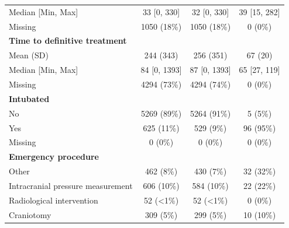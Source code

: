 \documentclass[12pt, a4paper]{article}
\begin{document}
\begin{appendices}
\begin{table}[t!]
{\begin{tabular}{lccc}
				\hspace{3mm}Median [Min, Max]                 & 33 [0, 330]       & 32 [0, 330]       & 39 [15, 282]  \\
				\hspace{3mm}Missing                           & 1050 (18\%)       & 1050 (18\%)       & 0 (0\%)       \\
				\textbf{Time to definitive treatment}         &                   &                   &               \\
				\hspace{3mm}Mean (SD)                         & 244 (343)         & 256 (351)         & 67 (20)       \\
				\hspace{3mm}Median [Min, Max]                 & 84 [0, 1393]      & 87 [0, 1393]      & 65 [27, 119]  \\
				\hspace{3mm}Missing                           & 4294 (73\%)       & 4294 (74\%)       & 0 (0\%)       \\
				\textbf{Intubated}                            &                   &                   &               \\
				\hspace{3mm}No                                & 5269 (89\%)       & 5264 (91\%)       & 5 (5\%)       \\
				\hspace{3mm}Yes                               & 625 (11\%)        & 529 (9\%)         & 96 (95\%)     \\
				\hspace{3mm}Missing                           & 0 (0\%)           & 0 (0\%)           & 0 (0\%)       \\
				\textbf{Emergency procedure}                  &                   &                   &               \\
				\hspace{3mm}Other                             & 462 (8\%)         & 430 (7\%)         & 32 (32\%)     \\
				\hspace{3mm}Intracranial pressure measurement & 606 (10\%)        & 584 (10\%)        & 22 (22\%)     \\
				\hspace{3mm}Radiological intervention         & 52 (\textless1\%) & 52 (\textless1\%) & 0 (0\%)       \\
				\hspace{3mm}Craniotomy                        & 309 (5\%)         & 299 (5\%)         & 10 (10\%)     \\

\end{tabular}}
\end{table}
\end{appendices}
\end{document}
